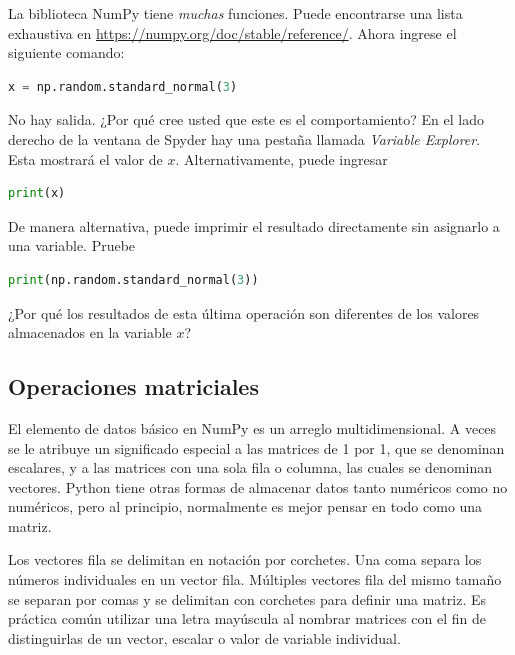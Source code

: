 \vs

La biblioteca NumPy tiene \textit{muchas} funciones. Puede encontrarse una lista exhaustiva en \url{https://numpy.org/doc/stable/reference/}. Ahora ingrese el siguiente comando:

\begin{lstlisting}[language=Python]
	x = np.random.standard_normal(3)
\end{lstlisting}

No hay salida. ¿Por qué cree usted que este es el comportamiento? \QA En el lado derecho de la ventana de Spyder hay una pestaña llamada \textit{Variable Explorer}. Esta mostrará el valor de $x$. Alternativamente, puede ingresar

\begin{lstlisting}[language=Python]
	print(x)
\end{lstlisting}

De manera alternativa, puede imprimir el resultado directamente sin asignarlo a una variable. Pruebe

\begin{lstlisting}[language=Python]
	print(np.random.standard_normal(3))
\end{lstlisting}

¿Por qué los resultados de esta última operación son diferentes de los valores almacenados en la variable $x$? \QA



\subsection{Operaciones matriciales}

El elemento de datos básico en NumPy es un arreglo multidimensional.
A veces se le atribuye un significado especial a las matrices de 1 por 1, que se
denominan escalares, y a las matrices con una sola fila o columna, las cuales
se denominan vectores. Python tiene otras formas de almacenar datos tanto
numéricos como no numéricos, pero al principio, normalmente es mejor
pensar en todo como una matriz.

Los vectores fila se delimitan en notación por corchetes. Una coma separa los números individuales en un vector fila. Múltiples vectores fila del mismo tamaño se separan por comas y se delimitan con corchetes para definir una matriz. Es práctica común utilizar una letra mayúscula al nombrar matrices con el fin de distinguirlas de un vector, escalar o valor de variable individual.

